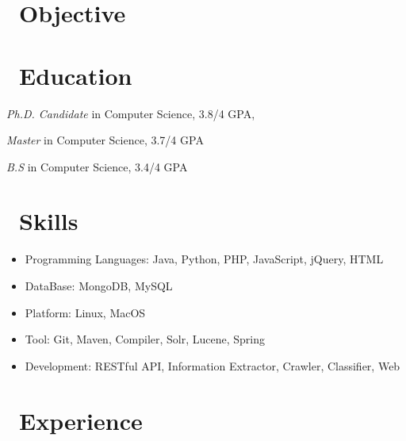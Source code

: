 \documentclass{resume}
\begin{document}





\section{\faSearch\ Objective}



\section{\faGraduationCap\ Education}

\textit{Ph.D. Candidate} in Computer Science, 3.8/4 GPA,

\textit{Master} in Computer Science, 3.7/4 GPA

\textit{B.S} in Computer Science, 3.4/4 GPA


\section{\faCogs\ Skills}
\begin{itemize}[parsep=0.5ex]
  \item Programming Languages: Java, Python, PHP, JavaScript, jQuery, HTML
  \item DataBase: MongoDB, MySQL
  \item Platform: Linux, MacOS
  \item Tool: Git, Maven, Compiler, Solr, Lucene, Spring
  \item Development: RESTful API, Information Extractor, Crawler, Classifier, Web
\end{itemize}


\section{\faUsers\ Experience}
\end{document}
